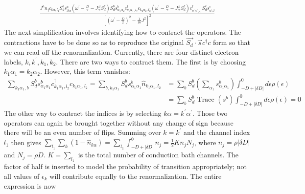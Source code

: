 \documentclass{revtex4-2}
\numberwithin{equation}{section}
\begin{document}
\begin{equation}\begin{aligned}
	\frac{J^3 n_j  c_{k\alpha,l_1} S_d^a s^a_{\beta \alpha} \left(\omega^\prime - \frac{D}{2} - J \frac{\beta}{2}S_d^z\right)S_d^b s^b_{\alpha_1 \alpha_2} c^\dagger_{k_1\alpha_1,l_2}c_{k_2 \alpha_2,l_2} \left(\omega^\prime - \frac{D}{2} - J \frac{\beta}{2}S_d^z\right) c^\dagger_{k^\prime\alpha^\prime, l_1} S_d^c s^c_{\alpha^\prime \beta}}{\left[\left(\omega^\prime - \frac{D}{2}\right)^2 - \frac{1}{16}J^2\right]^2} 
\end{aligned}\end{equation}
The next simplification involves identifying how to contract the operators. The contractions have to be done so as to reproduce the original \(\vec{S_d}\cdot\vec{s}c^\dagger c\) form so that we can read off the renormalization. Currently, there are four distinct electron labels, \(k,k^\prime,k_1,k_2\). There are two ways to contract them. The first is by choosing \(k_1\alpha_1 = k_2\alpha_2\). However, this term vanishes:
\begin{equation}\begin{aligned}
	\sum_{k_1\alpha_1,b}S_d^b s^b_{\alpha_1 \alpha_1} c^\dagger_{k_1\alpha_1,l_2}c_{k_1 \alpha_1,l_2} = \sum_{b,k_1\alpha_1}S_d^b s^b_{\alpha_1 \alpha_1}\hat n_{k_1\alpha_1,l_2} &= \sum_{b}S_d^b \left(\sum_{\alpha_1}s^b_{\alpha_1 \alpha_1}\right) \int_{-D + |\delta D|}^0 d\epsilon \rho(\epsilon)\\
																						      &= \sum_b S_d^b \text{ Trace }(s^b)\int_{-D + |\delta D|}^0 d\epsilon \rho(\epsilon)= 0
\end{aligned}\end{equation}
The other way to contract the indices is by selecting \(k\alpha = k^\prime \alpha^\prime\). Those two operators can again be brought together without any change of sign because there will be an even number of flips. Summing over \(k=k^\prime\) and the channel index \(l_1\) then gives \(\sum_{l_1}\sum_k \left(1 - \hat n_{k\alpha}\right) = \sum_{l_1}\int_{-D + |\delta D|}^ 0 n_j = \frac{1}{2}K n_j N_j\), where \(n_j = \rho |\delta D|\) and \(N_j = \rho D\). \(K = \sum_{l_1}\) is the total number of conduction bath channels. The factor of half is inserted to model the probability of transition appropriately; not all values of \(\epsilon_k\) will contribute equally to the renormalization. The entire expression is now
\end{document}
